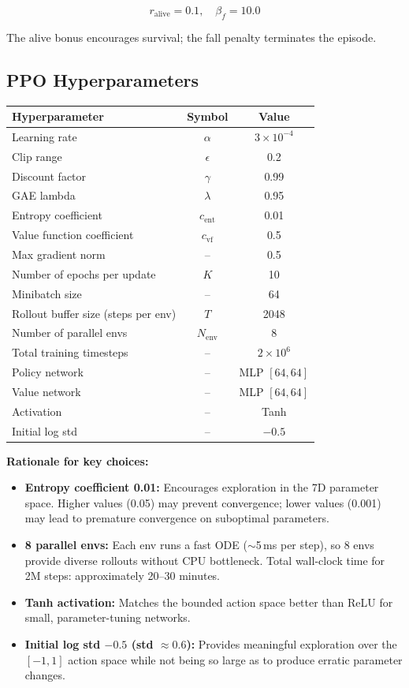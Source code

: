 \documentclass[11pt]{article}
\begin{document}
\begin{equation}
r_{\mathrm{alive}} = 0.1, \quad \beta_f = 10.0
\label{eq:alive-fall}
\end{equation}

The alive bonus encourages survival; the fall penalty terminates the episode.

\subsection{PPO Hyperparameters}
\label{sec:hyperparams}

\begin{center}
\begin{tabular}{lcc}
\toprule
\textbf{Hyperparameter} & \textbf{Symbol} & \textbf{Value} \\
\midrule
Learning rate & $\alpha$ & $3 \times 10^{-4}$ \\
Clip range & $\epsilon$ & 0.2 \\
Discount factor & $\gamma$ & 0.99 \\
GAE lambda & $\lambda$ & 0.95 \\
Entropy coefficient & $c_{\mathrm{ent}}$ & 0.01 \\
Value function coefficient & $c_{\mathrm{vf}}$ & 0.5 \\
Max gradient norm & -- & 0.5 \\
Number of epochs per update & $K$ & 10 \\
Minibatch size & -- & 64 \\
Rollout buffer size (steps per env) & $T$ & 2048 \\
Number of parallel envs & $N_{\mathrm{env}}$ & 8 \\
Total training timesteps & -- & $2 \times 10^6$ \\
Policy network & -- & MLP $[64, 64]$ \\
Value network & -- & MLP $[64, 64]$ \\
Activation & -- & Tanh \\
Initial log std & -- & $-0.5$ \\
\bottomrule
\end{tabular}
\end{center}

\textbf{Rationale for key choices:}
\begin{itemize}
    \item \textbf{Entropy coefficient 0.01:} Encourages exploration in the 7D parameter space. Higher values (0.05) may prevent convergence; lower values (0.001) may lead to premature convergence on suboptimal parameters.
    \item \textbf{8 parallel envs:} Each env runs a fast ODE ($\sim$5\,ms per step), so 8 envs provide diverse rollouts without CPU bottleneck. Total wall-clock time for 2M steps: approximately 20--30 minutes.
    \item \textbf{Tanh activation:} Matches the bounded action space better than ReLU for small, parameter-tuning networks.
    \item \textbf{Initial log std $-0.5$ (std $\approx 0.6$):} Provides meaningful exploration over the $[-1,1]$ action space while not being so large as to produce erratic parameter changes.
\end{itemize}
\end{document}
